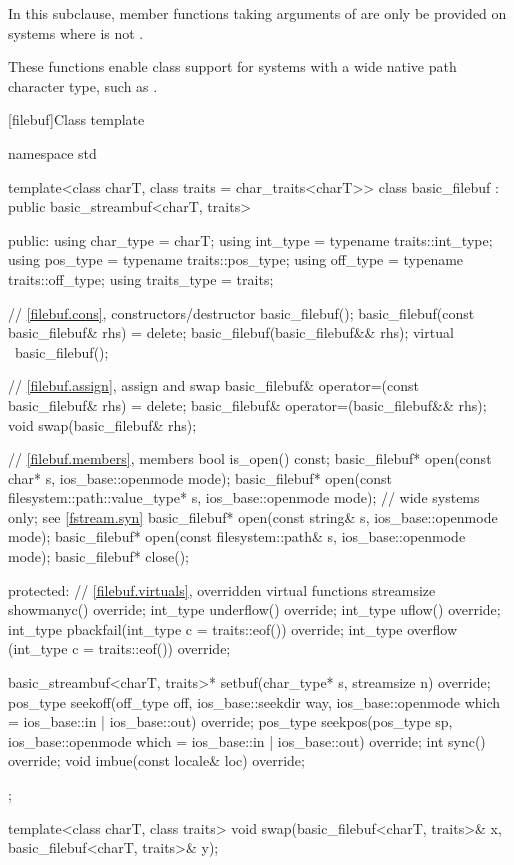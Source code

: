 \pnum
In this subclause, member functions taking arguments of 
are only be provided on systems where  is not .
\begin{note}
These functions enable class  support for systems with a wide native path character type, such as .
\end{note}

[filebuf]{Class template }

%
\begin{codeblock}
namespace std {
  template<class charT, class traits = char_traits<charT>>
  class basic_filebuf : public basic_streambuf<charT, traits> {
  public:
    using char_type   = charT;
    using int_type    = typename traits::int_type;
    using pos_type    = typename traits::pos_type;
    using off_type    = typename traits::off_type;
    using traits_type = traits;

    // \ref{filebuf.cons}, constructors/destructor
    basic_filebuf();
    basic_filebuf(const basic_filebuf& rhs) = delete;
    basic_filebuf(basic_filebuf&& rhs);
    virtual ~basic_filebuf();

    // \ref{filebuf.assign}, assign and swap
    basic_filebuf& operator=(const basic_filebuf& rhs) = delete;
    basic_filebuf& operator=(basic_filebuf&& rhs);
    void swap(basic_filebuf& rhs);

    // \ref{filebuf.members}, members
    bool is_open() const;
    basic_filebuf* open(const char* s, ios_base::openmode mode);
    basic_filebuf* open(const filesystem::path::value_type* s,
                        ios_base::openmode mode);  // wide systems only; see \ref{fstream.syn}
    basic_filebuf* open(const string& s,
                        ios_base::openmode mode);
    basic_filebuf* open(const filesystem::path& s,
                        ios_base::openmode mode);
    basic_filebuf* close();

  protected:
    // \ref{filebuf.virtuals}, overridden virtual functions
    streamsize showmanyc() override;
    int_type underflow() override;
    int_type uflow() override;
    int_type pbackfail(int_type c = traits::eof()) override;
    int_type overflow (int_type c = traits::eof()) override;

    basic_streambuf<charT, traits>* setbuf(char_type* s,
                                           streamsize n) override;
    pos_type seekoff(off_type off, ios_base::seekdir way,
                     ios_base::openmode which
                      = ios_base::in | ios_base::out) override;
    pos_type seekpos(pos_type sp,
                     ios_base::openmode which
                      = ios_base::in | ios_base::out) override;
    int      sync() override;
    void     imbue(const locale& loc) override;
  };

  template<class charT, class traits>
    void swap(basic_filebuf<charT, traits>& x,
              basic_filebuf<charT, traits>& y);
}
\end{codeblock}

